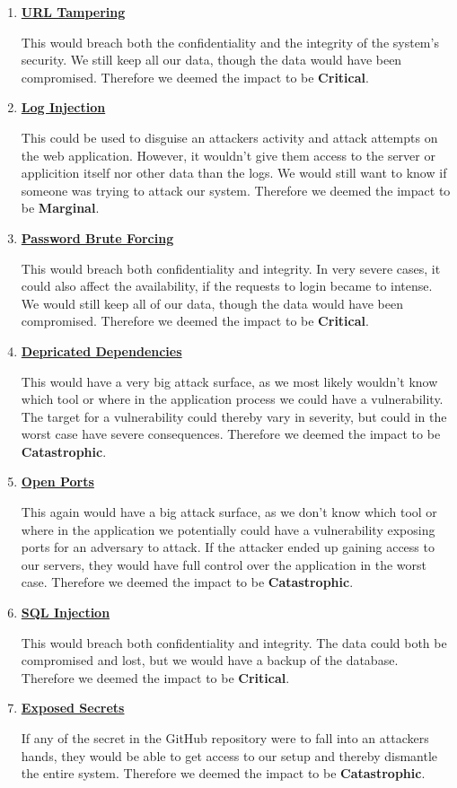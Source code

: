 \begin{enumerate}
    \item \textbf{\underline{URL Tampering}}

    This would breach both the confidentiality and the integrity of the system's security. We still keep all our data, though the data would have been compromised. Therefore we deemed the impact to be \textbf{Critical}.
    \item \textbf{\underline{Log Injection}}

    This could be used to disguise an attackers activity and attack attempts on the web application. However, it wouldn't give them access to the server or applicition itself nor other data than the logs. We would still want to know if someone was trying to attack our system. Therefore we deemed the impact to be \textbf{Marginal}.
    \item \textbf{\underline{Password Brute Forcing}}

    This would breach both confidentiality and integrity. In very severe cases, it could also affect the availability, if the requests to login became to intense. We would still keep all of our data, though the data would have been compromised. Therefore we deemed the impact to be \textbf{Critical}.
    \item \textbf{\underline{Depricated Dependencies}}

    This would have a very big attack surface, as we most likely wouldn't know which tool or where in the application process we could have a vulnerability. The target for a vulnerability could thereby vary in severity, but could in the worst case have severe consequences. Therefore we deemed the impact to be \textbf{Catastrophic}.
    \item \textbf{\underline{Open Ports}}

    This again would have a big attack surface, as we don't know which tool or where in the application we potentially could have a vulnerability exposing ports for an adversary to attack. If the attacker ended up gaining access to our servers, they would have full control over the application in the worst case. Therefore we deemed the impact to be \textbf{Catastrophic}.
    \item \textbf{\underline{SQL Injection}}

    This would breach both confidentiality and integrity. The data could both be compromised and lost, but we would have a backup of the database. Therefore we deemed the impact to be \textbf{Critical}.
    \item \textbf{\underline{Exposed Secrets}}

    If any of the secret in the GitHub repository were to fall into an attackers hands, they would be able to get access to our setup and thereby dismantle the entire system. Therefore we deemed the impact to be \textbf{Catastrophic}.
\end{enumerate}
